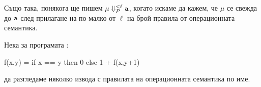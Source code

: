 \begin{description}
\item
  \begin{figure}[h!]
    \begin{prooftree}
    \end{prooftree}
  \end{figure}
\item
  \begin{figure}[h!]
    \begin{prooftree}
    \end{prooftree}
  \end{figure}
\end{description}

\newpage

Също така, понякога ще пишем $\mu \Downarrow^{<\ell}_P \vv{a}$, когато искаме да кажем, че
$\mu$ се свежда до $\vv{a}$ след прилагане на по-малко от $\ell$ на брой правила от операционната семантика.

\begin{example}
  Нека за програмата :
  \begin{haskellcode}
    f(x,y) = if x == y then 0 else 1 + f(x,y+1)
  \end{haskellcode}
  да разгледаме няколко извода с правилата на операционната семантика по име.
\end{example}


